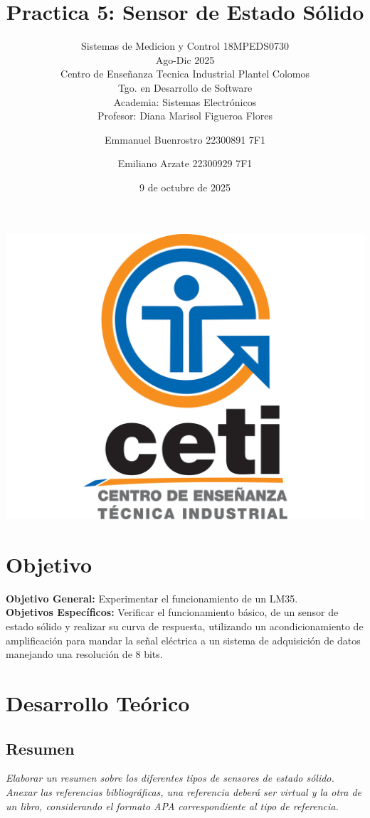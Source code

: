 \documentclass[11pt]{scrartcl}
\title {Practica 5: Sensor de Estado Sólido}
\subtitle{Sistemas de Medicion y Control 18MPEDS0730 \\ Ago-Dic 2025 \\ Centro de Enseñanza Tecnica Industrial Plantel Colomos\\Tgo. en Desarrollo de Software \\ Academia: Sistemas Electrónicos\\Profesor: Diana Marisol Figueroa Flores }
\date{9 de octubre de 2025}
\author{Emmanuel Buenrostro 22300891 7F1 \\ \and Emiliano Arzate 22300929 7F1 \\}
\newcommand{\indicacion}[1]{\noindent\textit{\small #1}}
\begin{document}
\maketitle
\begin{center}
   \includegraphics[scale=0.15]{../../cetilogo.jpg} 
\end{center}
\newpage

\section{Objetivo}

\textbf{Objetivo General:}
Experimentar el funcionamiento de un LM35.
\\


\textbf{Objetivos Específicos:} 
Verificar el funcionamiento básico, de un sensor de estado sólido y realizar su curva de respuesta, utilizando un acondicionamiento de amplificación para mandar la señal eléctrica a un sistema de adquisición de datos manejando una resolución de 8 bits.


\section{Desarrollo Teórico}

\subsection{Resumen }

\indicacion{
Elaborar un resumen sobre los diferentes tipos de sensores de estado sólido. Anexar las referencias bibliográficas, una referencia deberá ser virtual y la otra de un libro, considerando el formato APA correspondiente al tipo de referencia.
}
\end{document}
